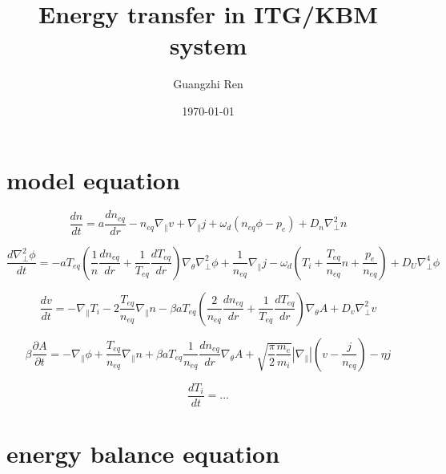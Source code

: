 \documentclass[11pt,a4paper]{article}
\title{Energy transfer in ITG/KBM system}
\author{Guangzhi Ren}
\date{\today}
\begin{document}
\maketitle

\section{model equation}

\begin{equation}
 	\frac{dn}{dt}=a\frac{dn_{eq}}{dr}-n_{eq}\nabla_{\parallel}v+\nabla_{\parallel}j+\omega_d(n_{eq}\phi-p_e)+D_n\nabla^2_\perp{n}
\end{equation}

\begin{equation}
	\frac{d\nabla^2_\perp\phi}{dt}=-aT_{eq}(\frac{1}{n}\frac{dn_{eq}}{dr}+\frac{1}{T_{eq}}\frac{dT_{eq}}{dr})\nabla_\theta\nabla^2_\perp\phi+\frac{1}{n_{eq}}\nabla_{\parallel}j-\omega_d(T_i+\frac{T_{eq}}{n_{eq}}n+\frac{p_e}{n_{eq}})+D_U\nabla^4_\perp\phi
\end{equation}

\begin{equation}
\frac{dv}{dt}=-\nabla_\parallel{T_i}-2\frac{T_{eq}}{n_{eq}}\nabla_\parallel{n}-\beta{aT_{eq}}(\frac{2}{n_{eq}}\frac{dn_{eq}}{dr}+\frac{1}{T_{eq}}\frac{dT_{eq}}{dr})\nabla_\theta{A}+D_v\nabla^2_\perp{v}
\end{equation}

\begin{equation}
\beta\frac{\partial{A}}{\partial{t}}=-\nabla_\parallel\phi+\frac{T_{eq}}{n_{eq}}\nabla_\parallel{n}+\beta{aT_{eq}}\frac{1}{n_{eq}}\frac{dn_{eq}}{dr}\nabla_\theta{A}+\sqrt{\frac{\pi}{2}\frac{m_e}{m_i}}|\nabla_{\parallel}|(v-\frac{j}{n_{eq}})-\eta{j}
\end{equation}

\begin{equation}
\frac{dT_i}{dt}=...
\end{equation}


\section{energy balance equation}
\end{document}
